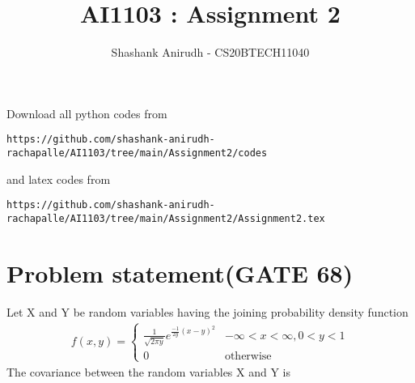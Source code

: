 \documentclass[journal,12pt,twocolumn]{IEEEtran}
\begin{document}
     \def\rightbox#1{\makebox[0in][r]{#1}}
     \def\centbox#1{\makebox[0in]{#1}}
     \def\topbox#1{\raisebox{-\baselineskip}[0in][0in]{#1}}
     \def\midbox#1{\raisebox{-0.5\baselineskip}[0in][0in]{#1}}
\vspace{3cm}
\title{AI1103 : Assignment 2}
\author{Shashank Anirudh - CS20BTECH11040}
\maketitle
\newpage
\bigskip
\renewcommand{\thefigure}{\theenumi}
\renewcommand{\thetable}{\theenumi}
Download all python codes from 
\begin{lstlisting}
https://github.com/shashank-anirudh-rachapalle/AI1103/tree/main/Assignment2/codes
\end{lstlisting}
%
and latex codes from 
%
\begin{lstlisting}
https://github.com/shashank-anirudh-rachapalle/AI1103/tree/main/Assignment2/Assignment2.tex
\end{lstlisting}
\section*{\textbf{Problem statement(GATE 68)}}
Let X and Y be random variables having the joining probability density function
\begin{align}
f(x,y)=
\begin{cases}
\frac{1}{\sqrt{2\pi y}}e^{\frac{-1}{2y}(x-y)^2} &-\infty<x<\infty,0<y<1\\
0 &\text{otherwise}
\end{cases}
\end{align}
The covariance between the random variables X and Y is\\
\end{document}
